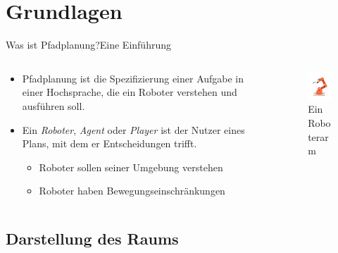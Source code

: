\documentclass[t,aspectratio=169,dvipsnames]{beamer}
\begin{document}
\section{Grundlagen}
\begin{frame}{Was ist Pfadplanung?}{Eine Einführung}
	\begin{columns}[T]
		\begin{column}[T]{0.6\textwidth}
			\begin{itemize}
				\item Pfadplanung ist die Spezifizierung einer Aufgabe in einer Hochsprache, die ein Roboter verstehen und ausführen soll.
				\newline\newline
				\item Ein \textit{Roboter}, \textit{Agent} oder \textit{Player} ist der Nutzer eines Plans, mit dem er Entscheidungen trifft.
				
				\begin{itemize}
					\item Roboter sollen seiner Umgebung verstehen
					\item Roboter haben Bewegungseinschränkungen
				\end{itemize}
			\end{itemize}
		\end{column}
		\begin{column}[T]{0.4\textwidth}
			\begin{figure}
				\includegraphics[width=4.0cm]{images/Bild1.png}
				\caption{Ein Roboterarm}
			\end{figure}
		\end{column}
	\end{columns}
\end{frame}

\subsection{Darstellung des Raums}
\end{document}
